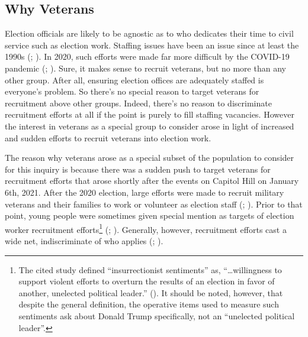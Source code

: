 \documentclass[
  11pt,
  a4paper,
]{scrartcl}
\begin{document}
\subsection{Why Veterans}\label{why-veterans}

Election officials are likely to be agnostic as to who dedicates their
time to civil service such as election work. Staffing issues have been
an issue since at least the 1990s (; ). In 2020, such efforts were made far more difficult by the
COVID-19 pandemic (;
). Sure, it makes sense to recruit
veterans, but no more than any other group. After all, ensuring election
offices are adequately staffed is everyone's problem. So there's no
special reason to target veterans for recruitment above other groups.
Indeed, there's no reason to discriminate recruitment efforts at all if
the point is purely to fill staffing vacancies. However the interest in
veterans as a special group to consider arose in light of increased and
sudden efforts to recruit veterans into election work.

The reason why veterans arose as a special subset of the population to
consider for this inquiry is because there was a sudden push to target
veterans for recruitment efforts that arose shortly after the events on
Capitol Hill on January 6th, 2021. After the 2020 election, large
efforts were made to recruit military veterans and their families to
work or volunteer as election staff
(;
). Prior to that
point, young people were sometimes given special mention as targets of
election worker recruitment efforts\footnote{The cited study defined
  ``insurrectionist sentiments'' as, ``\ldots willingness to support
  violent efforts to overturn the results of an election in favor of
  another, unelected political leader.'' (). It should be noted, however, that despite the
  general definition, the operative items used to measure such
  sentiments ask about Donald Trump specifically, not an ``unelected
  political leader''.} (;
). Generally,
however, recruitment efforts cast a wide net, indiscriminate of who
applies (;
).
\end{document}
